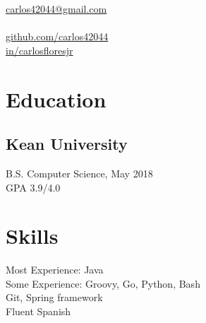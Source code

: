 \documentclass[]{hieudo-build}
\begin{document}
{    
 \href{mailto:carlos42044@gmail.com}{ carlos42044@gmail.com}\hspace*{-10cm}\\
\hspace*{.11cm}{908-499-8332}\\
\href{https://github.com/carlos42044}{ github.com/carlos42044}\\
\href{https://www.linkedin.com/in/carlosfloresjr}{ in/carlosfloresjr}
}
    
\begin{minipage}[t]{0.34\textwidth} 

\section{Education} 

\subsection{Kean University}
B.S. Computer Science, May 2018 \\
GPA 3.9/4.0  \\
\sectionsep


\section{Skills}
Most Experience: Java\\
Some Experience: Groovy, Go, Python, Bash\\
\iffalse
\location{Frameworks:}
AngularJS, jQuery, Ionic, 
NodeJS, Karma/Jasmine/Protractor \\
\fi
{}
Git, Spring framework\\

Fluent Spanish \\
 

\sectionsep


\end{minipage}
\end{document}
